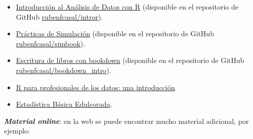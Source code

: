 \documentclass[
]{book}
\begin{document}
\begin{itemize}
  \begin{itemize}
  \item
    \href{https://rubenfcasal.github.io/intror}{Introducción al Análisis de Datos con R}
    (disponible en el repositorio de GitHub
    \href{https://github.com/rubenfcasal/intror}{rubenfcasal/intror}).
  \item
    \href{https://rubenfcasal.github.io/simbook}{Prácticas de Simulación}
    (disponible en el repositorio de GitHub
    \href{https://github.com/rubenfcasal/simbook}{rubenfcasal/simbook}).
  \item
    \href{https://rubenfcasal.github.io/bookdown_intro/}{Escritura de libros con bookdown}
    (disponible en el repositorio de GitHub
    \href{https://github.com/rubenfcasal/bookdown_intro}{rubenfcasal/bookdown\_intro}).
  \item
    \href{https://www.datanalytics.com/libro_r/index.html}{R para profesionales de los datos: una introducción}.
  \item
    \href{https://bookdown.org/aquintela/EBE}{Estadística Básica Edulcorada}.
  \end{itemize}
\end{itemize}

\textbf{\emph{Material online}}:
en la web se puede encontrar mucho material adicional, por ejemplo:
\end{document}
